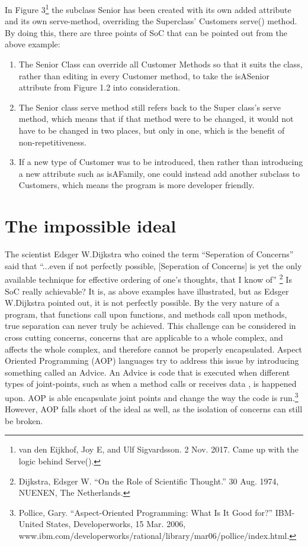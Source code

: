 \documentclass[11pt,a4paper]{article}
\begin{document}
\begin{flushleft}
 In Figure 3\footnote{van den Eijkhof, Joy E, and Ulf Sigvardsson. 2 Nov. 2017. Came up with the logic behind Serve().} the subclass Senior has been created with its own added attribute and its own serve-method, overriding the Superclass’ Customers serve() method. By doing this, there are three points of SoC that can be pointed out from the above example:
\begin{enumerate}
\item The Senior Class can override all Customer Methods so that it suits the class, rather than editing in every Customer method, to take the isASenior attribute from Figure 1.2 into consideration. 
\item The Senior class serve method still refers back to the Super class’s serve method, which means that if that method were to be changed, it would not have to be changed in two places, but only in one, which is the benefit of non-repetitiveness.  
\item If a new type of Customer was to be introduced, then rather than introducing a new attribute such as isAFamily, one could instead add another subclass to Customers, which means the program is more developer friendly.
\end{enumerate}


\section{The impossible ideal}
The scientist Edsger W.Dijkstra who coined the term “Seperation of Concerns” said that “...even if not perfectly possible, [Seperation of Concerns] is yet the only available technique for effective ordering of one's thoughts, that I know of” \footnote{Dijkstra, Edsger W. “On the Role of Scientific Thought.” 30 Aug. 1974, NUENEN, The Netherlands.}  Is SoC really achievable? It is, as above examples have illustrated, but as Edsger W.Dijkstra pointed out, it is not perfectly possible. By the very nature of a program, that functions call upon functions, and methods call upon methods, true separation can never truly be achieved. This challenge can be considered in cross cutting concerns, concerns that are applicable to a whole complex, and affects the whole complex, and therefore cannot be properly encapsulated. Aspect Oriented Programming (AOP) languages try to address this issue by introducing something called an Advice. An Advice is code that is executed when different types of joint-points, such as when a method calls or receives data , is happened upon. AOP is able encapsulate joint points and change the way the code is run.\footnote{Pollice, Gary. “Aspect-Oriented Programming: What Is It Good for?” IBM- United States, Developerworks, 15 Mar. 2006, www.ibm.com/developerworks/rational/library/mar06/pollice/index.html.}  However, AOP falls short of the ideal as well, as the isolation of concerns can still be broken. 


\end{flushleft}
\end{document}
